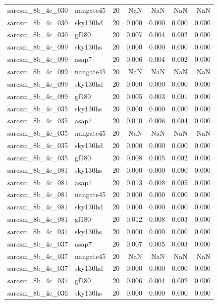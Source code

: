 \begin{tabular}{llrrrrr}
sarcsm\_8b\_4c\_030 & nangate45 & 20 & NaN & NaN & NaN & NaN \\
sarcsm\_8b\_4c\_030 & sky130hd & 20 & 0.000 & 0.000 & 0.000 & 0.000 \\
sarcsm\_8b\_4c\_030 & gf180 & 20 & 0.007 & 0.004 & 0.002 & 0.000 \\
sarcsm\_8b\_4c\_099 & sky130hs & 20 & 0.000 & 0.000 & 0.000 & 0.000 \\
sarcsm\_8b\_4c\_099 & asap7 & 20 & 0.006 & 0.004 & 0.002 & 0.000 \\
sarcsm\_8b\_4c\_099 & nangate45 & 20 & NaN & NaN & NaN & NaN \\
sarcsm\_8b\_4c\_099 & sky130hd & 20 & 0.000 & 0.000 & 0.000 & 0.000 \\
sarcsm\_8b\_4c\_099 & gf180 & 20 & 0.005 & 0.003 & 0.001 & 0.000 \\
sarcsm\_8b\_4c\_035 & sky130hs & 20 & 0.000 & 0.000 & 0.000 & 0.000 \\
sarcsm\_8b\_4c\_035 & asap7 & 20 & 0.010 & 0.006 & 0.004 & 0.000 \\
sarcsm\_8b\_4c\_035 & nangate45 & 20 & NaN & NaN & NaN & NaN \\
sarcsm\_8b\_4c\_035 & sky130hd & 20 & 0.000 & 0.000 & 0.000 & 0.000 \\
sarcsm\_8b\_4c\_035 & gf180 & 20 & 0.008 & 0.005 & 0.002 & 0.000 \\
sarcsm\_8b\_4c\_081 & sky130hs & 20 & 0.000 & 0.000 & 0.000 & 0.000 \\
sarcsm\_8b\_4c\_081 & asap7 & 20 & 0.013 & 0.008 & 0.005 & 0.000 \\
sarcsm\_8b\_4c\_081 & nangate45 & 20 & 0.000 & 0.000 & 0.000 & 0.000 \\
sarcsm\_8b\_4c\_081 & sky130hd & 20 & 0.000 & 0.000 & 0.000 & 0.000 \\
sarcsm\_8b\_4c\_081 & gf180 & 20 & 0.012 & 0.008 & 0.003 & 0.000 \\
sarcsm\_8b\_4c\_037 & sky130hs & 20 & 0.000 & 0.000 & 0.000 & 0.000 \\
sarcsm\_8b\_4c\_037 & asap7 & 20 & 0.007 & 0.005 & 0.003 & 0.000 \\
sarcsm\_8b\_4c\_037 & nangate45 & 20 & NaN & NaN & NaN & NaN \\
sarcsm\_8b\_4c\_037 & sky130hd & 20 & 0.000 & 0.000 & 0.000 & 0.000 \\
sarcsm\_8b\_4c\_037 & gf180 & 20 & 0.006 & 0.004 & 0.002 & 0.000 \\
sarcsm\_8b\_4c\_036 & sky130hs & 20 & 0.000 & 0.000 & 0.000 & 0.000 \\

\end{tabular}
